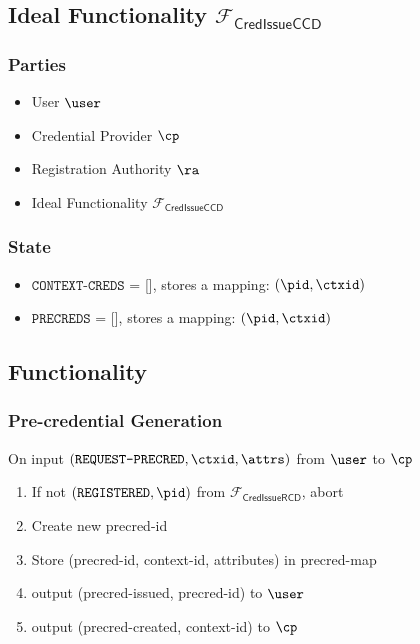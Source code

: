 \subsection{Ideal Functionality $\mathcal{F}_{\mathsf{CredIssueCCD}}$}

\subsubsection{Parties}
\begin{itemize}
    \item User $\user$
    \item Credential Provider $\cp$
    \item Registration Authority $\ra$
    \item Ideal Functionality $\mathcal{F}_{\mathsf{CredIssueCCD}}$
\end{itemize}

\subsubsection{State}
\begin{itemize}
    \item $\texttt{CONTEXT-CREDS}$ = [], stores a mapping: $(\pid, \ctxid)$
    \item $\texttt{PRECREDS}$ = [], stores a mapping: $(\pid, \ctxid)$
\end{itemize}

\subsection{Functionality}

\subsubsection{Pre-credential Generation}
On input $(\texttt{REQUEST-PRECRED}, \ctxid, \attrs)$ from $\user$ to $\cp$
\begin{enumerate}
    \item If not $(\texttt{REGISTERED}, \pid)$ from $\mathcal{F}_{\mathsf{CredIssueRCD}}$, abort
    \item Create new precred-id
    \item Store (precred-id, context-id, attributes) in precred-map
    \item output (precred-issued, precred-id) to $\user$
    \item output (precred-created, context-id) to $\cp$
\end{enumerate}

